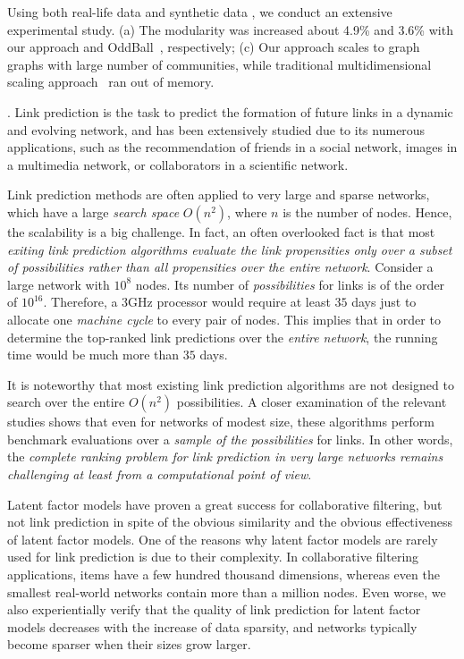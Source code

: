 Using both real-life data and synthetic
data , we conduct an extensive experimental study.
 (a) The modularity \cite{newman1} was increased about 4.9\% and 3.6\% with our approach and OddBall~\cite{akoglu14}, respectively; (c) Our approach scales to graph graphs with large number of communities, while traditional  multidimensional scaling approach~\cite{mds} ran out of memory.

. Link prediction is the task to predict the formation of future links in a dynamic and evolving network, and has been extensively studied due to its numerous applications, such as the recommendation of friends in a social network, images in a multimedia network, or collaborators in a scientific network.


Link prediction methods are often applied to very large and sparse networks, which have a large {\em search space} $O(n^2)$,
where $n$ is the number of nodes. Hence, the scalability is a big challenge. In fact, an often overlooked fact is that most {\em exiting link prediction algorithms evaluate the link propensities only over a subset of possibilities rather than all propensities over the entire network}. %
Consider a large network with $10^8$ nodes. Its number of {\em possibilities} for links
is of the order of $10^{16}$. Therefore, a 3GHz processor would
require at least $35$ days just to allocate one {\em machine cycle} to
every pair of nodes. This implies that in order to determine the
top-ranked link predictions over the {\em entire network}, the
running time would be much more than $35$ days.

It is noteworthy that most existing link prediction algorithms are not designed to search over the entire
$O(n^2)$ possibilities. A closer examination of the relevant
studies shows that even for networks of modest size, these
algorithms perform benchmark evaluations over a {\em
sample of the possibilities} for links.  In other
words, the {\em complete ranking problem for link prediction in
very large networks remains challenging at least from a
computational point of view}.


Latent factor models have proven a great success for
collaborative filtering, but not link prediction in spite of the obvious
similarity and
the obvious effectiveness of latent factor models. One of the reasons why latent factor models are rarely used for
link prediction is due to their complexity. In
collaborative filtering applications, items have a few hundred thousand dimensions, whereas even the smallest  real-world networks contain more than a million nodes.
Even worse, we also experientially verify that the quality of link prediction for latent factor models decreases with the increase of data sparsity,
and networks typically become sparser when their sizes grow larger.





